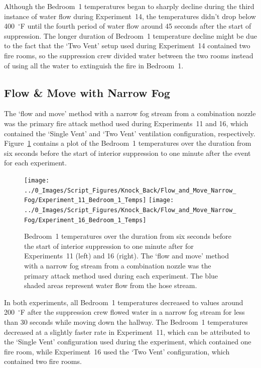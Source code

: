 \documentclass[12pt,oneside]{book}
\begin{document}
Although the Bedroom~1 temperatures began to sharply decline during the third instance of water flow during Experiment~14, the temperatures didn't drop below 400~$^\circ$F until the fourth period of water flow around 45 seconds after the start of suppression. The longer duration of Bedroom~1 temperature decline might be due to the fact that the `Two Vent' setup used during Experiment~14 contained two fire rooms, so the suppression crew divided water between the two rooms instead of using all the water to extinguish the fire in Bedroom~1.

\FloatBarrier

\subsection{Flow \& Move with Narrow Fog}
The `flow and move' method with a narrow fog stream from a combination nozzle was the primary fire attack method used during Experiments~11 and 16, which contained the `Single Vent' and `Two Vent' ventilation configuration, respectively. Figure~\ref{fig:knockback_int_3} contains a plot of the Bedroom~1 temperatures over the duration from six seconds before the start of interior suppression to one minute after the event for each experiment.

\begin{figure}[H]
	\centering
	\texttt{[image: ../0\_Images/Script\_Figures/Knock\_Back/Flow\_and\_Move\_Narrow\_Fog/Experiment\_11\_Bedroom\_1\_Temps]}
	\texttt{[image: ../0\_Images/Script\_Figures/Knock\_Back/Flow\_and\_Move\_Narrow\_Fog/Experiment\_16\_Bedroom\_1\_Temps]}
	\caption[Flow \& Move with Narrow Fog --- Bedroom~1 Temperatures]{Bedroom~1 temperatures over the duration from six seconds before the start of interior suppression to one minute after for Experiments~11 (left) and 16 (right). The `flow and move' method with a narrow fog stream from a combination nozzle was the primary attack method used during each experiment. The blue shaded areas represent water flow from the hose stream.}
	\label{fig:knockback_int_3}
\end{figure}

In both experiments, all Bedroom~1 temperatures decreased to values around 200~$^\circ$F after the suppression crew flowed water in a narrow fog stream for less than 30 seconds while moving down the hallway. The Bedroom~1 temperatures decreased at a slightly faster rate in Experiment~11, which can be attributed to the `Single Vent' configuration used during the experiment, which contained one fire room, while Experiment~16 used the `Two Vent' configuration, which contained two fire rooms.
\end{document}
